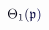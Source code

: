 \documentclass[12pt]{article}
\begin{document}
\makeatletter
\renewcommand*{\@textcolor}[3]{%
  \protect\leavevmode
  \begingroup
    \color#1{#2}#3%
  \endgroup
}
\makeatother
\begin{displaymath}
\mathcolor[RGB]{0,0,15}{\Theta} _ { \mathcolor[RGB]{0,0,30}{1} } \mathcolor[RGB]{0,0,45}{(} \mathfrak { \mathcolor[RGB]{0,0,60}{p} } \mathcolor[RGB]{0,0,75}{)}
\end{displaymath}
\end{document}
